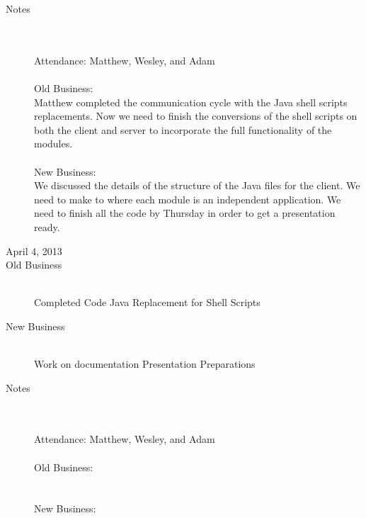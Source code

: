 \documentclass[11pt, letterpaper]{report}
\begin{document}
\begin{description}
\item[Notes] \hfill \\ \hfill \\
Attendance:  Matthew, Wesley, and Adam\\ \\
Old Business: \\
Matthew completed the communication cycle with the Java shell scripts replacements. Now we need to finish the conversions of the shell scripts on both the client and server to incorporate the full functionality of the modules. 
\\ \\
New Business:\\
We discussed the details of the structure of the Java files for the client. We need to make to where each module is an independent application. We need to finish all the code by Thursday in order to get a presentation ready.


\newpage
\item[\Large April 4, 2013]
\hypertarget{April 4, 2013} {}
\item[Old Business] \hfill \\
\subitem Completed Code
\subitem Java Replacement for Shell Scripts
\item[New Business] \hfill \\
\subitem Work on documentation
\subitem Presentation Preparations 

\item[Notes] \hfill \\ \hfill \\
Attendance:  Matthew, Wesley, and Adam\\ \\
Old Business: \\
\\ \\
New Business:\\


\end{description}
\end{document}
